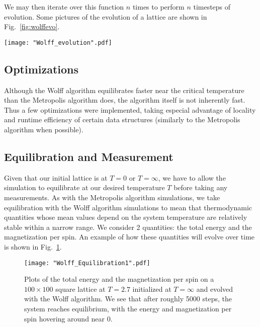 \documentclass[twocolumn,aps,prl]{revtex4-1} %
\begin{document}
We may then iterate over this function $n$ times to perform $n$ timesteps of evolution. Some pictures of the evolution of a lattice are shown in Fig.~\ref{fig:wolffevo}.
\begin{figure*}
	\texttt{[image: "Wolff\_evolution".pdf]}
	\caption{\label{fig:wolffevo}The evolution of a $100 \times 100$ square lattice at $T = 2.4$ via the Wolff algorithm. The sequence is ordered from left to right, top to bottom. The two spin states $+1$ and $-1$ correspond to black and white, respectively. We have initialized the system in the $T = 0$ state, and plotted the system after 0, 1, 5, 10, 20, 50, 100, 500, and 1000 Monte Carlo steps. The lattice equilibrates much faster through the Wolff algorithm than through the Metropolis algorithm.}
\end{figure*}

\subsection{Optimizations}
Although the Wolff algorithm equilibrates faster near the critical temperature than the Metropolis algorithm does, the algorithm itself is not inherently fast. Thus a few optimizations were implemented, taking especial advantage of locality and runtime efficiency of certain data structures (similarly to the Metropolis algorithm when possible).

\subsection{Equilibration and Measurement}
Given that our initial lattice is at $T = 0$ or $T = \infty$, we have to allow the simulation to equilibrate at our desired temperature $T$ before taking any measurements. As with the Metropolis algorithm simulations, we take equilibration with the Wolff algorithm simulations to mean that thermodynamic quantities whose mean values depend on the system temperature are relatively stable within a narrow range. We consider 2 quantities: the total energy and the magnetization per spin. An example of how these quantities will evolve over time is shown in Fig.~\ref{fig:equil}. 
\begin{figure}
	\texttt{[image: "Wolff\_Equilibration1".pdf]}
	\caption{\label{fig:equil}Plots of the total energy and the magnetization per spin on a $100 \times 100$ square lattice at $T = 2.7$ initialized at $T = \infty$ and evolved with the Wolff algorithm. We see that after roughly 5000 steps, the system reaches equilibrium, with the energy and magnetization per spin hovering around near $0$.}
\end{figure}
\end{document}
